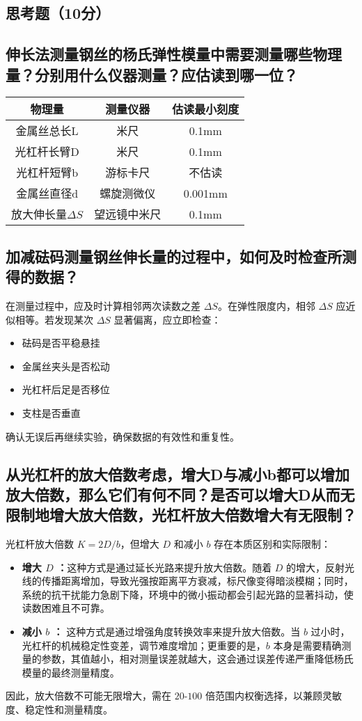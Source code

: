\documentclass[]{../template/Report}%
\begin{document}
\begin{fullreportonly}
\section{思考题（10分）}
\subsection{伸长法测量钢丝的杨氏弹性模量中需要测量哪些物理量？分别用什么仪器测量？应估读到哪一位？}
\begin{table}[H]
	\centering
	\begin{tabular}{|c|c|c|}
		\hline
		\textbf{物理量} & \textbf{测量仪器} & \textbf{估读最小刻度} \\
		\hline
		金属丝总长L & 米尺 & 0.1mm \\
		\hline
		光杠杆长臂D & 米尺 & 0.1mm \\
		\hline
		光杠杆短臂b & 游标卡尺 & 不估读 \\
		\hline
		金属丝直径d & 螺旋测微仪 & 0.001mm \\
		\hline
		放大伸长量$\Delta S$ & 望远镜中米尺 & 0.1mm \\
		\hline
	\end{tabular}
\end{table}
\subsection{加减砝码测量钢丝伸长量的过程中，如何及时检查所测得的数据？}

在测量过程中，应及时计算相邻两次读数之差 $\Delta S$。在弹性限度内，相邻 $\Delta S$ 应近似相等。若发现某次 $\Delta S$ 显著偏离，应立即检查：
\begin{itemize}
\item 砝码是否平稳悬挂
\item 金属丝夹头是否松动
\item 光杠杆后足是否移位
\item 支柱是否垂直
\end{itemize}
确认无误后再继续实验，确保数据的有效性和重复性。

\subsection{从光杠杆的放大倍数考虑，增大D与减小b都可以增加放大倍数，那么它们有何不同？是否可以增大D从而无限制地增大放大倍数，光杠杆放大倍数增大有无限制？}

光杠杆放大倍数 $K = 2D/b$，但增大 $D$ 和减小 $b$ 存在本质区别和实际限制：
\begin{itemize}
\item \textbf{增大 $D$ ：}这种方式是通过延长光路来提升放大倍数。随着 $D$ 的增大，反射光线的传播距离增加，导致光强按距离平方衰减，标尺像变得暗淡模糊；同时，系统的抗干扰能力急剧下降，环境中的微小振动都会引起光路的显著抖动，使读数困难且不可靠。
\item \textbf{减小 $b$ ：} 这种方式是通过增强角度转换效率来提升放大倍数。当 $b$ 过小时，光杠杆的机械稳定性变差，调节难度增加；更重要的是，$b$ 本身是需要精确测量的参数，其值越小，相对测量误差就越大，这会通过误差传递严重降低杨氏模量的最终测量精度。
\end{itemize}
因此，放大倍数不可能无限增大，需在 $20$-$100$ 倍范围内权衡选择，以兼顾灵敏度、稳定性和测量精度。
\end{fullreportonly}
\newpage
\insertnotes
\end{document}
